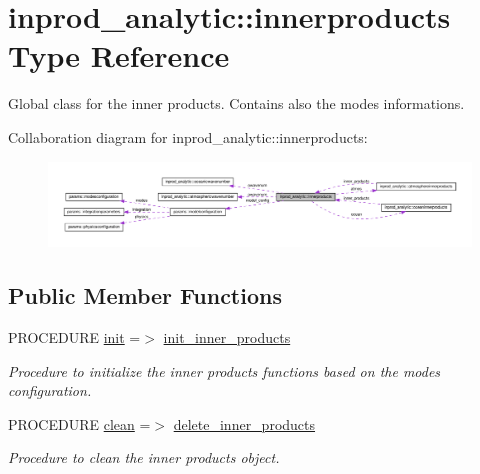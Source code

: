 \hypertarget{structinprod__analytic_1_1innerproducts}{}\section{inprod\+\_\+analytic\+:\+:innerproducts Type Reference}
\label{structinprod__analytic_1_1innerproducts}


Global class for the inner products. Contains also the modes informations.  




Collaboration diagram for inprod\+\_\+analytic\+:\+:innerproducts\+:\nopagebreak
\begin{figure}[H]
\begin{center}
\leavevmode
\includegraphics[width=350pt]{structinprod__analytic_1_1innerproducts__coll__graph}
\end{center}
\end{figure}
\subsection*{Public Member Functions}
\begin{DoxyCompactItemize}
\item 
\mbox{\label{structinprod__analytic_1_1innerproducts_a76f38356e38405a715ad3c8cff7a6781}} 
P\+R\+O\+C\+E\+D\+U\+RE \hyperlink{structinprod__analytic_1_1innerproducts_a76f38356e38405a715ad3c8cff7a6781}{init} =$>$ \hyperlink{namespaceinprod__analytic_ad2e5c28272f877bf96af8ee821004386}{init\+\_\+inner\+\_\+products}
\begin{DoxyCompactList}\small\item\em Procedure to initialize the inner products functions based on the modes configuration. \end{DoxyCompactList}\item 
\mbox{\label{structinprod__analytic_1_1innerproducts_a5ea60d33169a70443f5581108a0f5100}} 
P\+R\+O\+C\+E\+D\+U\+RE \hyperlink{structinprod__analytic_1_1innerproducts_a5ea60d33169a70443f5581108a0f5100}{clean} =$>$ \hyperlink{namespaceinprod__analytic_a1319e98f839daff8d840469929c349fb}{delete\+\_\+inner\+\_\+products}
\begin{DoxyCompactList}\small\item\em Procedure to clean the inner products object. \end{DoxyCompactList}\end{DoxyCompactItemize}
